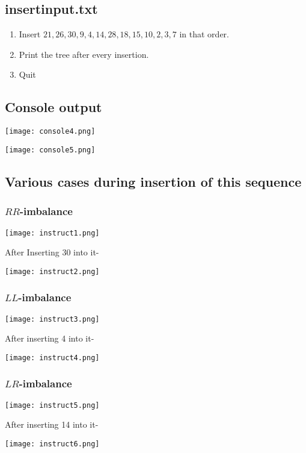 \documentclass{article}
\begin{document}
\subsection{insertinput.txt}
\begin{enumerate}
	\item Insert $21,26,30,9,4,14,28,18,15,10,2,3,7$ in that order.
	\item Print the tree after every insertion.
	\item Quit
\end{enumerate}

\subsection{Console output}
\begin{center}
\texttt{[image: console4.png]}
\end{center}
\begin{center}
\texttt{[image: console5.png]}
\end{center}

\subsection{Various cases during insertion of this sequence}
\subsubsection{$RR$-imbalance}
\begin{center}
\texttt{[image: instruct1.png]}
\end{center}
After Inserting 30 into it-
\begin{center}
\texttt{[image: instruct2.png]}
\end{center}

\subsubsection{$LL$-imbalance}
\begin{center}
\texttt{[image: instruct3.png]}
\end{center}
After inserting 4 into it-
\begin{center}
\texttt{[image: instruct4.png]}
\end{center}

\subsubsection{$LR$-imbalance}
\begin{center}
\texttt{[image: instruct5.png]}
\end{center}
After inserting 14 into it-
\begin{center}
\texttt{[image: instruct6.png]}
\end{center}
\end{document}
